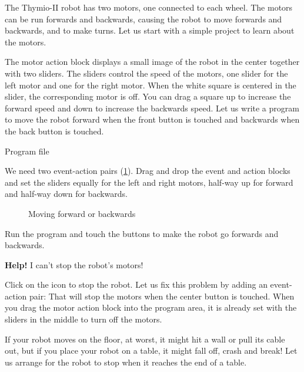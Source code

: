 \label{c.moving}


The Thymio-II robot has two motors, one connected to each wheel. The
motors can be run forwards and backwards, causing the robot to move
forwards and backwards, and to make turns. Let us start with a simple
project to learn about the motors.

The motor action block  displays a small image of the
robot in the center together with two sliders. The sliders control the
speed of the motors, one slider for the left motor and one for the right
motor. When the white square is centered in the slider, the
corresponding motor is off. You can drag a square up to increase the
forward speed and down to increase the backwards speed.
Let us write a program to move the robot forward when the front button
is touched and backwards when the back button is touched.

{\raggedleft \hfill Program file }

We need two event-action pairs (\cref{fig.nostop}). Drag and drop
the event and action blocks and set the sliders equally for the left and
right motors, half-way up for forward and half-way down for backwards.

\begin{figure}
\begin{center}
\caption{Moving forward or backwards}\label{fig.nostop}
\end{center}
\end{figure}

Run the program and touch the buttons to
make the robot go forwards and backwards.

\newpage


\textbf{Help!} I can't stop the robot's motors!

Click on the icon  to stop the robot.
Let us fix this problem by adding an event-action pair: 
That will stop the motors when the center button is touched. When you
drag the motor action block into the program area, it is already set
with the sliders in the middle to turn off the motors.


If your robot moves on the floor, at worst, it might hit a wall or pull
its cable out, but if you place your robot on a table, it might fall
off, crash and break! Let us arrange for the robot to stop when it
reaches the end of a table.

